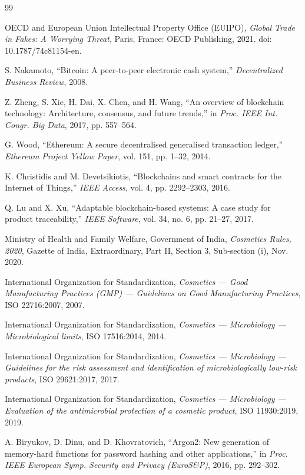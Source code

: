 \documentclass[12pt,a4paper]{report}
\begin{document}
\begin{thebibliography}{99}
\small
\setlength{\itemsep}{1.5pt}
\setlength{\parsep}{0pt}

 OECD and European Union Intellectual Property Office (EUIPO), \textit{Global Trade in Fakes: A Worrying Threat}, Paris, France: OECD Publishing, 2021. doi: 10.1787/74c81154-en.

 S. Nakamoto, ``Bitcoin: A peer-to-peer electronic cash system,'' \textit{Decentralized Business Review}, 2008.

 Z. Zheng, S. Xie, H. Dai, X. Chen, and H. Wang, ``An overview of blockchain technology: Architecture, consensus, and future trends,'' in \textit{Proc. IEEE Int. Congr. Big Data}, 2017, pp. 557--564.

 G. Wood, ``Ethereum: A secure decentralised generalised transaction ledger,'' \textit{Ethereum Project Yellow Paper}, vol. 151, pp. 1--32, 2014.

 K. Christidis and M. Devetsikiotis, ``Blockchains and smart contracts for the Internet of Things,'' \textit{IEEE Access}, vol. 4, pp. 2292--2303, 2016.

 Q. Lu and X. Xu, ``Adaptable blockchain-based systems: A case study for product traceability,'' \textit{IEEE Software}, vol. 34, no. 6, pp. 21--27, 2017.

 Ministry of Health and Family Welfare, Government of India, \textit{Cosmetics Rules, 2020}, Gazette of India, Extraordinary, Part II, Section 3, Sub-section (i), Nov. 2020.

 International Organization for Standardization, \textit{Cosmetics --- Good Manufacturing Practices (GMP) --- Guidelines on Good Manufacturing Practices}, ISO 22716:2007, 2007.

 International Organization for Standardization, \textit{Cosmetics --- Microbiology --- Microbiological limits}, ISO 17516:2014, 2014.

 International Organization for Standardization, \textit{Cosmetics --- Microbiology --- Guidelines for the risk assessment and identification of microbiologically low-risk products}, ISO 29621:2017, 2017.

 International Organization for Standardization, \textit{Cosmetics --- Microbiology --- Evaluation of the antimicrobial protection of a cosmetic product}, ISO 11930:2019, 2019.

 A. Biryukov, D. Dinu, and D. Khovratovich, ``Argon2: New generation of memory-hard functions for password hashing and other applications,'' in \textit{Proc. IEEE European Symp. Security and Privacy (EuroS\&P)}, 2016, pp. 292--302.


\end{thebibliography}
\end{document}
